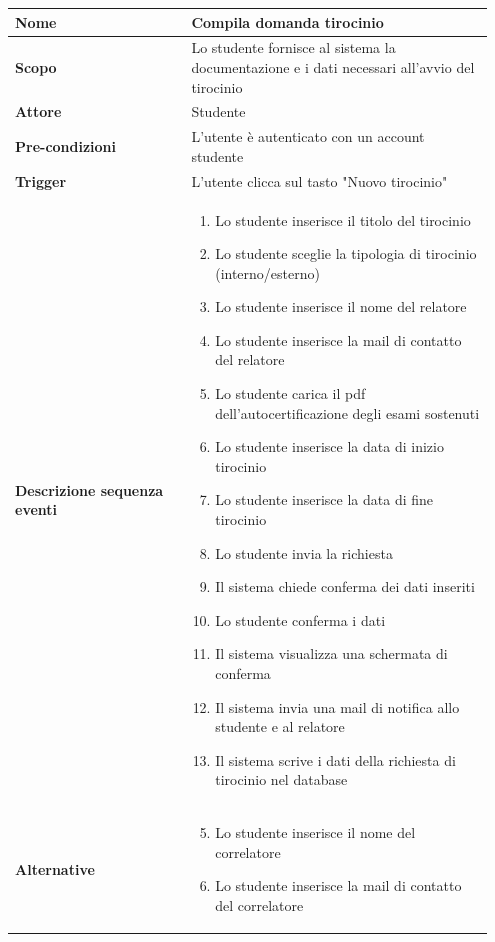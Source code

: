 \documentclass[12pt]{article}
\begin{document}
 \begin{longtable}{|p{0.35\linewidth} | p{0.6\linewidth}|}
   \hline
   \textbf{Nome} & Compila domanda tirocinio \\ \hline
   \textbf{Scopo} & Lo studente fornisce al sistema la documentazione e i dati necessari all'avvio del tirocinio \\ \hline
   \textbf{Attore} & Studente \\ \hline
   \textbf{Pre-condizioni} & L'utente è autenticato con un account studente \\ \hline
   \textbf{Trigger} & L'utente clicca sul tasto "Nuovo tirocinio" \\ \hline
   \textbf{Descrizione sequenza eventi} &
   \begin{enumerate}[label=(\arabic*)]
      \item Lo studente inserisce il titolo del tirocinio
      \item Lo studente sceglie la tipologia di tirocinio (interno/esterno)
      \item Lo studente inserisce il nome del relatore
      \item Lo studente inserisce la mail di contatto del relatore
      \item Lo studente carica il pdf dell'autocertificazione degli esami sostenuti
      \item Lo studente inserisce la data di inizio tirocinio
      \item Lo studente inserisce la data di fine tirocinio
      \item Lo studente invia la richiesta
      \item Il sistema chiede conferma dei dati inseriti
      \item Lo studente conferma i dati
      \item Il sistema visualizza una schermata di conferma
      \item Il sistema invia una mail di notifica allo studente e al relatore
      \item Il sistema scrive i dati della richiesta di tirocinio nel database
   \end{enumerate} \\ \hline
   \textbf{Alternative} &
   \begin{enumerate}[label=(\arabic*')]
      \setcounter{enumi}{4}
      \item Lo studente inserisce il nome del correlatore
      \item Lo studente inserisce la mail di contatto del correlatore

\end{enumerate}
\end{longtable}
\end{document}
